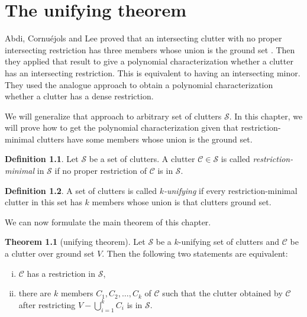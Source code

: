 \documentclass[a4paper, 12pt]{scrbook}
\theoremstyle{definition}
\newtheorem*{definition}{Definition}
\newtheorem{theorem}{Theorem}[chapter]
\begin{document}
\chapter{The unifying theorem}

Abdi, Cornuéjols and Lee proved that an intersecting clutter with no proper intersecting restriction has three members whose union is the ground set \cite{restrictions}.
Then they applied that result to give a polynomial characterization whether a clutter has an intersecting restriction.
This is equivalent to having an intersecting minor.
They used the analogue approach to obtain a polynomial characterization whether a clutter has a dense restriction.

We will generalize that approach to arbitrary set of clutters $\mathcal{S}$.
In this chapter, we will prove how to get the polynomial characterization given that restriction-minimal clutters have some members whose union is the ground set.

   \begin{definition}
       Let $\mathcal{S}$ be a set of clutters.
       A clutter $\mathcal{C} \in \mathcal{S}$ is called \emph{restriction-minimal} in $\mathcal{S}$ if no proper restriction of $\mathcal{C}$ is in $\mathcal{S}$.
   \end{definition}

   \begin{definition}
       A set of clutters is called \emph{$k$-unifying} if every restriction-minimal clutter in this set has $k$ members whose union is that clutters ground set.
   \end{definition}

   We can now formulate the main theorem of this chapter.

   \begin{theorem}[unifying theorem]\label{unifying}
       Let $\mathcal{S}$ be a $k$-unifying set of clutters and $\mathcal{C}$ be a clutter over ground set $V$.
       Then the following two statements are equivalent:
       \leavevmode
       \begin{enumerate}[(i)]
           \item $\mathcal{C}$ has a restriction in $\mathcal{S}$,
           \item there are $k$ members $C_1, C_2, \ldots, C_k$ of $\mathcal{C}$ such that the clutter obtained by $\mathcal{C}$ after restricting $V - \bigcup_{i=1}^k C_i$ is in $\mathcal{S}$.
       \end{enumerate}
   \end{theorem}
\end{document}
